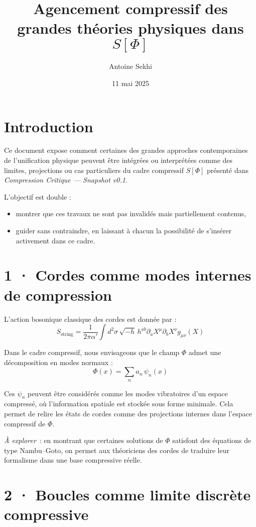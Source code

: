 \documentclass[11pt]{article}
\title{\textbf{Agencement compressif des grandes théories physiques dans $S[\Phi]$}}
\author{Antoine Sekhi}
\date{11 mai 2025}
\begin{document}
\maketitle

\section*{Introduction}

Ce document expose comment certaines des grandes approches contemporaines de l’unification physique peuvent être intégrées ou interprétées comme des limites, projections ou cas particuliers du cadre compressif $S[\Phi]$ présenté dans \textit{Compression Critique — Snapshot v0.1}.

L’objectif est double :
\begin{itemize}
  \item montrer que ces travaux ne sont pas invalidés mais partiellement contenus,
  \item guider sans contraindre, en laissant à chacun la possibilité de s’insérer activement dans ce cadre.
\end{itemize}

\section{1 · Cordes comme modes internes de compression}

L’action bosonique classique des cordes est donnée par :
\[
S_{\text{string}} = \frac{1}{2\pi \alpha'} \int d^2\sigma \, \sqrt{-h} \, h^{ab} \partial_a X^\mu \partial_b X^\nu g_{\mu\nu}(X)
\]

Dans le cadre compressif, nous envisageons que le champ $\Phi$ admet une décomposition en modes normaux :
\[
\Phi(x) = \sum_n a_n \, \psi_n(x)
\]

Ces $\psi_n$ peuvent être considérés comme les modes vibratoires d’un espace compressé, où l’information spatiale est stockée sous forme minimale. Cela permet de relire les états de cordes comme des projections internes dans l’espace compressif de $\Phi$.

\emph{À explorer} : en montrant que certaines solutions de $\Phi$ satisfont des équations de type Nambu–Goto, on permet aux théoriciens des cordes de traduire leur formalisme dans une base compressive réelle.

\section{2 · Boucles comme limite discrète compressive}
\end{document}
